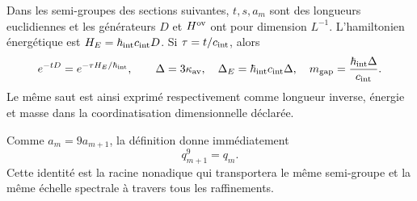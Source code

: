 Dans les semi-groupes des sections suivantes, \(t,s,a_m\) sont des longueurs euclidiennes et les générateurs \(D\) et \(H^{\rm ov}\) ont pour dimension \(L^{-1}\). L'hamiltonien énergétique est \(H_E=\hbar_{\rm int}c_{\rm int}D\). Si \(\tau=t/c_{\rm int}\), alors
\[
 e^{-tD}=e^{-\tau H_E/\hbar_{\rm int}},\qquad
 \Delta=3\kappa_{\rm av},\quad
 \Delta_E=\hbar_{\rm int}c_{\rm int}\Delta,\quad
 m_{\rm gap}=\frac{\hbar_{\rm int}\Delta}{c_{\rm int}}.
\]
Le même saut est ainsi exprimé respectivement comme longueur inverse, énergie et masse dans la coordinatisation dimensionnelle déclarée.

Comme \(a_m=9a_{m+1}\), la définition donne immédiatement
\begin{equation}
 q_{m+1}^{9}=q_m.
 \label{eq:ym-nonadic-gap-root}
\end{equation}
Cette identité est la racine nonadique qui transportera le même semi-groupe et la
même échelle spectrale à travers tous les raffinements.
